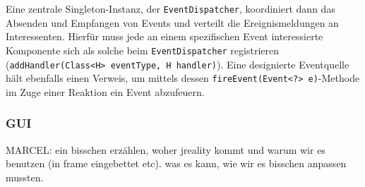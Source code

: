             Eine zentrale Singleton-Instanz, der \lstinline|EventDispatcher|, koordiniert dann das Absenden und Empfangen von Events
            und verteilt die Ereignismeldungen an Interessenten.
            Hierfür muss jede an einem spezifischen Event interessierte Komponente sich als solche beim
            \lstinline|EventDispatcher| registrieren (\lstinline|addHandler(Class<H> eventType, H handler)|).
            Eine designierte Eventquelle hält ebenfalls einen Verweis, um mittels dessen
            \lstinline|fireEvent(Event<?> e)|-Methode im Zuge einer Reaktion ein Event abzufeuern.

%
%            
%
%
%
%
%
%
%            
            
        \subsubsection{GUI\label{ssec:gui}}
             MARCEL: ein bisschen erzählen, woher jreality kommt und warum wir es benutzen (in frame eingebettet etc). was es kann, wie wir es bisschen anpassen mussten.
                
